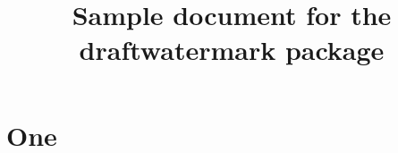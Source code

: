 \documentclass{article}
\title{Sample document for the draftwatermark package}
\author{}
\begin{document}
\maketitle
\section{One}
\lipsum[1-3]
\end{document}
